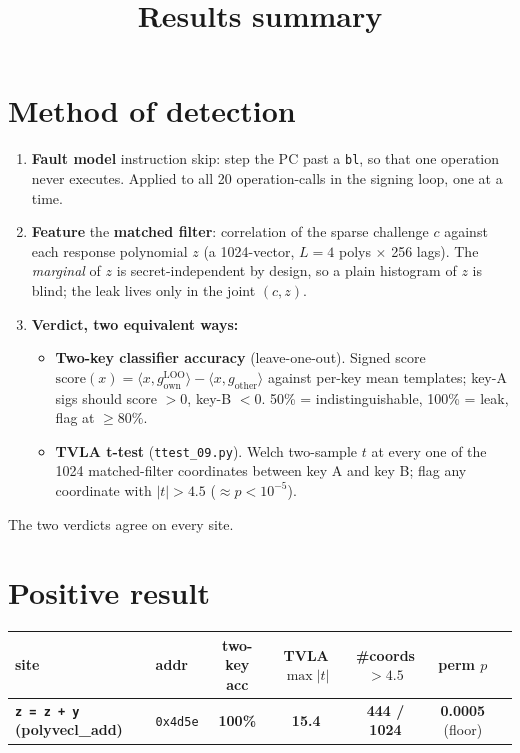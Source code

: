 \documentclass[11pt]{article}
\title{Results summary}
\author{}
\date{}
\newcommand{\tabst}{|t|}
\newcommand{\code}[1]{\texttt{#1}}
\begin{document}
\maketitle


\hrulefill

\section{Method of detection}



\begin{enumerate}[leftmargin=1.4em]
  \item \textbf{Fault model}  instruction skip: step the PC past a \code{bl},
    so that one operation never executes. Applied to all 20 operation-calls in
    the signing loop, one at a time.
  \item \textbf{Feature}  the \textbf{matched filter}:  correlation
    of the sparse challenge $c$ against each response polynomial $z$ (a
    1024-vector, $L=4$ polys $\times$ 256 lags). The \emph{marginal} of $z$ is
    secret-independent by design, so a plain histogram of $z$ is blind; the leak
    lives only in the joint $(c, z)$.
  \item \textbf{Verdict, two equivalent ways:}
  \begin{itemize}
    \item \textbf{Two-key classifier accuracy} (leave-one-out). Signed score
      $\mathrm{score}(x) = \langle x, g_{\text{own}}^{\text{LOO}}\rangle -
      \langle x, g_{\text{other}}\rangle$ against per-key mean templates; key-A
      sigs should score $>0$, key-B $<0$. 50\% = indistinguishable, 100\% =
      leak, flag at $\ge 80\%$.
    \item \textbf{TVLA t-test} (\code{ttest\_09.py}). Welch two-sample $t$ at
      every one of the 1024 matched-filter coordinates between key A and key B;
      flag any coordinate with $\tabst > 4.5$ ($\approx p < 10^{-5}$). 
  \end{itemize}
\end{enumerate}

The two verdicts agree on every site.

\hrulefill

\section{Positive result}

\begin{table}[h]
\centering
\begin{tabular}{@{}llccccc@{}}
\toprule
site & addr & two-key acc & TVLA $\max\tabst$ & \#coords $>4.5$ & perm $p$ \\
\midrule
\textbf{\code{z = z + y} (polyvecl\_add)} & \code{0x4d5e} & \textbf{100\%} &
\textbf{15.4} & \textbf{444 / 1024} & \textbf{0.0005} (floor) \\
\bottomrule
\end{tabular}
\end{table}
\end{document}
